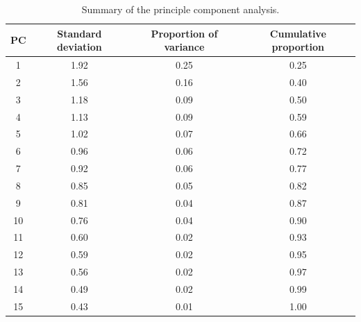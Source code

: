 \begin{table}[H]
	\centering
	\begin{tabular}{|c|c|c|c|}
		\hline
		\textbf{PC} & \textbf{Standard deviation} & \textbf{Proportion of variance} & \textbf{Cumulative proportion} \\
		\hline \hline
		 1 & 1.92 & 0.25 & 0.25 \\
		\hline
		 2 & 1.56 & 0.16 & 0.40 \\
		\hline
		 3 & 1.18 & 0.09 & 0.50 \\
		\hline
		 4 & 1.13 & 0.09 & 0.59 \\
		\hline
		 5 & 1.02 & 0.07 & 0.66 \\
		\hline
		 6 & 0.96 & 0.06 & 0.72 \\
		\hline
		 7 & 0.92 & 0.06 & 0.77 \\
		\hline
		 8 & 0.85 & 0.05 & 0.82 \\
		\hline
		 9 & 0.81 & 0.04 & 0.87 \\
		\hline
		10 & 0.76 & 0.04 & 0.90 \\
		\hline
		11 & 0.60 & 0.02 & 0.93 \\
		\hline
		12 & 0.59 & 0.02 & 0.95 \\
		\hline
		13 & 0.56 & 0.02 & 0.97 \\
		\hline
		14 & 0.49 & 0.02 & 0.99 \\
		\hline
		15 & 0.43 & 0.01 & 1.00 \\
		\hline
	\end{tabular}
	\caption{Summary of the principle component analysis.}
	\label{tbl:pca}
\end{table}

